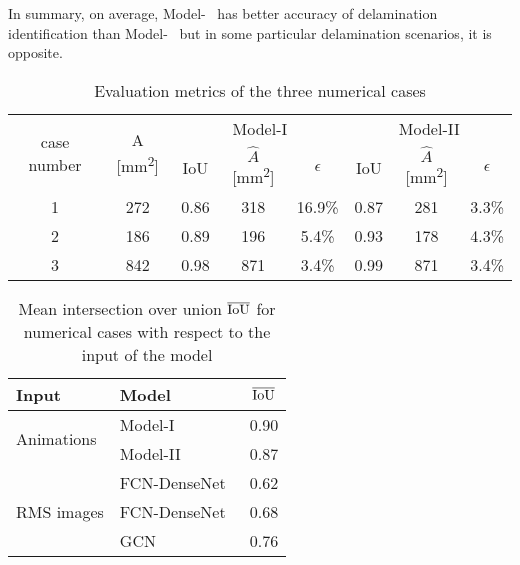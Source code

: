 \begin{sloppypar}
	In summary, on average, Model-~ has better accuracy of delamination identification than Model-~ but in some particular delamination scenarios, it is opposite.
	\begin{table}[]
		\caption{Evaluation metrics of the three numerical cases}
		\begin{tabular}{cccccccc}
			\toprule
			\multirow{2}{*}{case number} & \multicolumn{1}{c}{\multirow{2}{*}{A [mm\textsuperscript{2}]}} & \multicolumn{3}{c}{Model-I} & \multicolumn{3}{c}{Model-II} \\ \cmidrule(lr){3-5} \cmidrule(lr){6-8} 
			& \multicolumn{1}{c}{}  & \multicolumn{1}{c}{IoU}  & \multicolumn{1}{c}{\(\hat{A}\) [mm\textsuperscript{2}]} & \(\epsilon\) & \multicolumn{1}{c}{IoU}  & \multicolumn{1}{c}{\(\hat{A}\) [mm\textsuperscript{2}]} & \(\epsilon\) \\ 
			\midrule
			1 & 272 & \multicolumn{1}{c}{0.86} & \multicolumn{1}{c}{318} & 16.9\% & \multicolumn{1}{c}{0.87} & \multicolumn{1}{c}{281} & 3.3\% \\ 
			2 &  186  & \multicolumn{1}{c}{0.89} & \multicolumn{1}{c}{196} & 5.4\% & \multicolumn{1}{c}{0.93} & \multicolumn{1}{c}{178} & 4.3\% \\ 
			3 & 842 & \multicolumn{1}{c}{0.98} &\multicolumn{1}{c}{871} & 3.4\%   & \multicolumn{1}{c}{0.99} & \multicolumn{1}{c}{871} & 3.4\% \\ 
			\bottomrule
		\end{tabular}	
		\label{tab:num_cases}
	\end{table}
	\begin{table}[]
		\centering
		\caption{Mean intersection over union $\overline{\textup{IoU}}$ for numerical cases with respect to the input of the model}
		\begin{tabular}{llc}
			\toprule
			Input & Model & $\overline{\textup{IoU}}$ \\ 
			\midrule
			\multirow{2}{*}{Animations} & Model-I & 0.90 \\ & Model-II                    & 0.87     \\ \midrule
			\multirow{3}{*}{RMS images}  & FCN-DenseNet~\cite{Ijjeh2021} & 0.62     \\
			& FCN-DenseNet~\cite{Ijjeh2022} & 0.68     \\
			& GCN~\cite{Ijjeh2022}          & 0.76     \\ 
			\bottomrule

\end{tabular}
\end{table}
\end{sloppypar}
